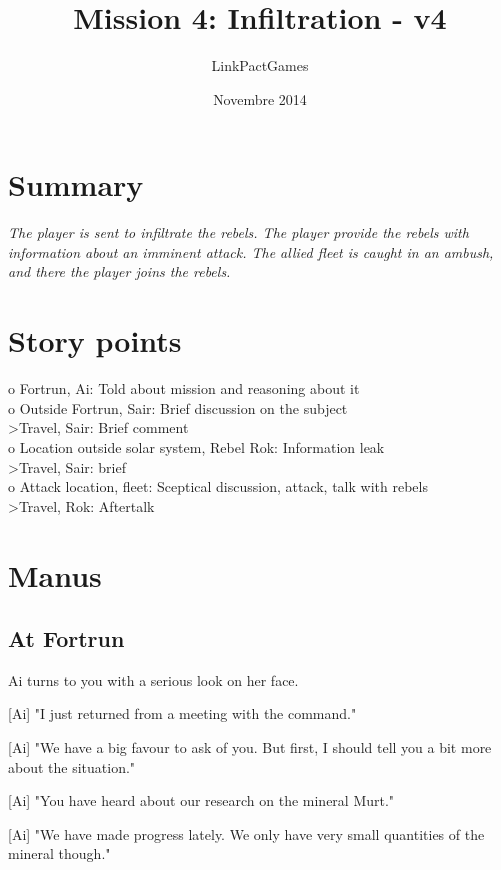 \documentclass[a4paper,12pt]{article}
\begin{document}
\title{Mission 4: Infiltration - v4}
\author{LinkPactGames}
\date{Novembre 2014}
\maketitle

\section{Summary}

\textit{The player is sent to infiltrate the rebels. The player provide
the rebels with information about an imminent attack. The allied
fleet is caught in an ambush, and there the player joins the rebels.}

\section{Story points}

o Fortrun, Ai: Told about mission and reasoning about it\\
o Outside Fortrun, Sair: Brief discussion on the subject\\
\textgreater Travel, Sair: Brief comment\\
o Location outside solar system, Rebel Rok: Information leak\\
\textgreater Travel, Sair: brief\\
o Attack location, fleet: Sceptical discussion, attack, talk with rebels\\
\textgreater Travel, Rok: Aftertalk

\section{Manus}

\subsection{At Fortrun}

Ai turns to you with a serious look on her face.

[Ai] "I just returned from a meeting with the command."

[Ai] "We have a big favour to ask of you. But first, I should tell you a bit more
about the situation."

[Ai] "You have heard about our research on the mineral Murt." 

[Ai] "We have made progress lately. We only have very small quantities of the mineral though."
\end{document}
